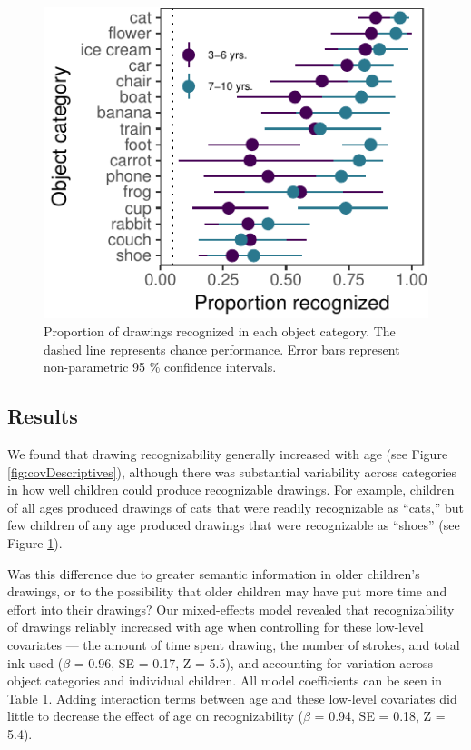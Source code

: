 \documentclass[10pt, letterpaper]{article}
\newenvironment{CodeChunk}{}{}
\begin{document}
\begin{CodeChunk}
\begin{figure}[H]

{\centering \includegraphics{figs/recognizabilityByItem-1} 

}

\caption[Proportion of drawings recognized in each object category]{Proportion of drawings recognized in each object category. The dashed line represents chance performance. Error bars represent non-parametric 95 \% confidence intervals. }\label{fig:recognizabilityByItem}
\end{figure}
\end{CodeChunk}

\subsection{Results}\label{results}

We found that drawing recognizability generally increased with age (see
Figure \ref{fig:covDescriptives}), although there was substantial
variability across categories in how well children could produce
recognizable drawings. For example, children of all ages produced
drawings of cats that were readily recognizable as ``cats,'' but few
children of any age produced drawings that were recognizable as
``shoes'' (see Figure \ref{fig:recognizabilityByItem}).

Was this difference due to greater semantic information in older
children's drawings, or to the possibility that older children may have
put more time and effort into their drawings? Our mixed-effects model
revealed that recognizability of drawings reliably increased with age
when controlling for these low-level covariates --- the amount of time
spent drawing, the number of strokes, and total ink used (\(\beta\) =
0.96, SE = 0.17, Z = 5.5), and accounting for variation across object
categories and individual children. All model coefficients can be seen
in Table 1. Adding interaction terms between age and these low-level
covariates did little to decrease the effect of age on recognizability
(\(\beta\) = 0.94, SE = 0.18, Z = 5.4).
\end{document}
